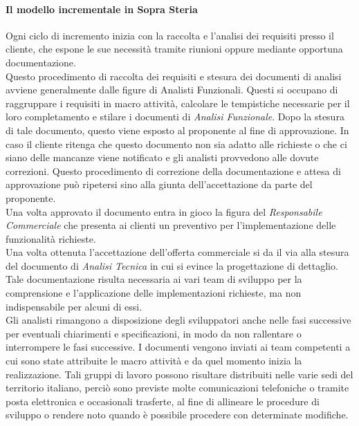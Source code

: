 	\paragraph{Il modello incrementale in Sopra Steria}
\leavevmode	\newline \newline
	Ogni ciclo di incremento inizia con la raccolta e l'analisi dei requisiti presso il cliente, che espone le sue necessità tramite riunioni oppure mediante opportuna documentazione.\\
	
	Questo procedimento di raccolta dei requisiti e stesura dei documenti di analisi avviene generalmente dalle figure di Analisti Funzionali. Questi si occupano di raggruppare i requisiti in macro attività, calcolare le tempistiche necessarie per il loro completamento e stilare i documenti di \textit{Analisi Funzionale}. Dopo la stesura di tale documento, questo viene esposto al proponente al fine di approvazione. In caso il cliente ritenga che questo documento non sia adatto alle richieste o che ci siano delle mancanze viene notificato e gli analisti provvedono alle dovute correzioni. Questo procedimento di correzione della documentazione e attesa di approvazione può ripetersi sino alla giunta dell'accettazione da parte del proponente.\\
	
	Una volta approvato il documento entra in gioco la figura del \textit{Responsabile Commerciale} che presenta ai clienti un preventivo per l'implementazione delle funzionalità richieste.\\ %
	
	Una volta ottenuta l'accettazione dell'offerta commerciale si da il via alla stesura del documento di \textit{Analisi Tecnica} in cui si evince la progettazione di dettaglio. Tale documentazione risulta necessaria ai vari team di sviluppo per la comprensione e l'applicazione delle implementazioni richieste, ma non indispensabile per alcuni di essi.\\
		
	Gli analisti rimangono a disposizione degli sviluppatori anche nelle fasi successive per eventuali chiarimenti e specificazioni, in modo da non rallentare o interrompere le fasi successive. I documenti vengono inviati ai team competenti a cui sono state attribuite le macro attività e da quel momento inizia la realizzazione. Tali gruppi di lavoro possono risultare distribuiti nelle varie sedi del territorio italiano, perciò sono previste molte comunicazioni telefoniche o tramite posta elettronica e occasionali trasferte, al fine di allineare le procedure di sviluppo o rendere noto quando è possibile procedere con determinate modifiche. \\
	
